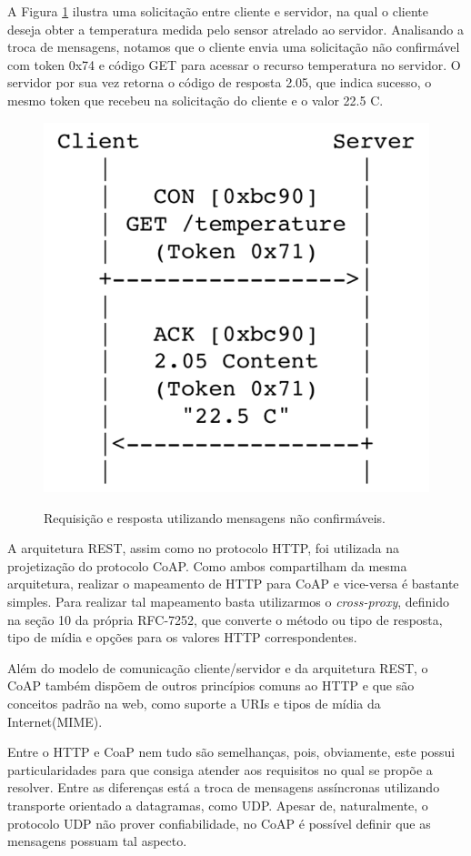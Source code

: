A Figura \ref{fig:fig4} ilustra uma solicitação entre cliente e servidor, na qual o cliente deseja obter a temperatura medida pelo sensor atrelado ao servidor.
Analisando a troca de mensagens, notamos que o cliente envia uma solicitação não confirmável com token 0x74 e código GET para acessar o recurso temperatura no servidor.
O servidor por sua vez retorna o código de resposta 2.05, que indica sucesso, o mesmo token que recebeu na solicitação do cliente e o valor 22.5 C.

\begin{figure}[htb!]
    \centering\includegraphics[height=.4\textwidth]{fig4.png} 
    \caption
    {\label{fig:fig4} Requisição e resposta utilizando mensagens não confirmáveis.} \cite{rfc7252}
\end{figure}

A arquitetura REST, assim como no protocolo HTTP\cite{rfc2616}, foi utilizada na projetização do protocolo CoAP.
Como ambos compartilham da mesma arquitetura, realizar o mapeamento de HTTP para CoAP e vice-versa é bastante simples.
Para realizar tal mapeamento basta utilizarmos o \textit{cross-proxy}, definido na seção 10 da própria RFC-7252\cite{rfc7252},
que converte o método ou tipo de resposta, tipo de mídia e opções para os valores HTTP correspondentes.

Além do modelo de comunicação cliente/servidor e da arquitetura REST, o CoAP também dispõem de outros princípios comuns ao HTTP e que são conceitos padrão na web,
como suporte a URIs\cite{rfc3986} e tipos de mídia da Internet(MIME)\cite{rfc2046}.

Entre o HTTP e CoaP nem tudo são semelhanças, pois, obviamente, este possui particularidades para que consiga atender aos requisitos no qual se propõe a resolver.
Entre as diferenças está a troca de mensagens assíncronas utilizando transporte orientado a datagramas, como UDP.
Apesar de, naturalmente, o protocolo UDP não prover confiabilidade, no CoAP é possível definir que as mensagens possuam tal aspecto.

